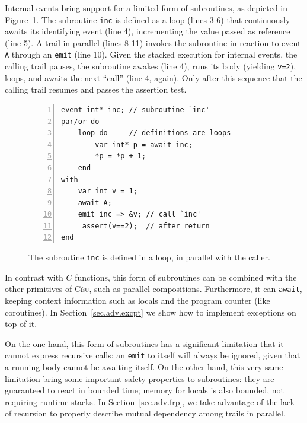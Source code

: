 \documentclass{acm_proc_article-sp}
\newcommand{\CEU}{\textsc{C\'{e}u}\xspace}
\newcommand{\code}[1] {{\small{\texttt{#1}}}}
\newcommand{\1}{\;}
\newcommand{\2}{\;\;}
\newcommand{\3}{\;\;\;}
\newcommand{\5}{\;\;\;\;\;}
\begin{document}
Internal events bring support for a limited form of subroutines, as depicted in 
Figure~\ref{lst.sub}.
The subroutine \code{inc} is defined as a loop (lines 3-6) that continuously 
awaits its identifying event (line 4), incrementing the value passed as 
reference (line 5).
A trail in parallel (lines 8-11) invokes the subroutine in reaction to event 
\code{A} through an \code{emit} (line 10).
Given the stacked execution for internal events, the calling trail pauses, the 
subroutine awakes (line 4), runs its body (yielding \code{v=2}), loops, and 
awaits the next ``call'' (line 4, again).
Only after this sequence that the calling trail resumes and passes the 
assertion test.
 
\begin{figure}
\begin{lstlisting}[numbers=left,xleftmargin=2em]
event int* inc; // subroutine `inc'
par/or do
    loop do     // definitions are loops
        var int* p = await inc;
        *p = *p + 1;
    end
with
    var int v = 1;
    await A;
    emit inc => &v; // call `inc'
    _assert(v==2);  // after return
end
\end{lstlisting}
\caption{ The subroutine \code{inc} is defined in a loop, in parallel with the 
caller.
\label{lst.sub}
}
\end{figure}

In contrast with $C$ functions, this form of subroutines can be combined with 
the other primitives of \CEU, such as parallel compositions.
Furthermore, it can \code{await}, keeping context information such as locals 
and the program counter (like coroutines).
In Section~\ref{sec.adv.excpt} we show how to implement exceptions on top of 
it.

On the one hand, this form of subroutines has a significant limitation that it 
cannot express recursive calls: an \code{emit} to itself will always be 
ignored, given that a running body cannot be awaiting itself.
%
On the other hand, this very same limitation bring some important safety 
properties to subroutines:
they are guaranteed to react in bounded time;
memory for locals is also bounded, not requiring runtime stacks.
%
In Section~\ref{sec.adv.frp}, we take advantage of the lack of recursion to 
properly describe mutual dependency among trails in parallel.
\end{document}
